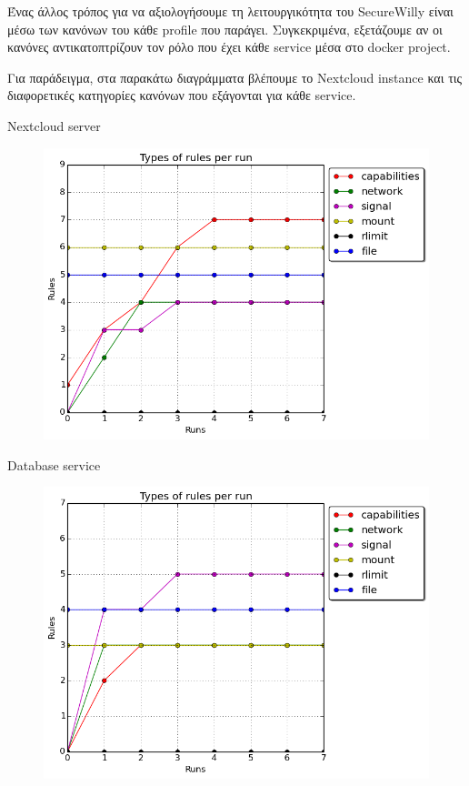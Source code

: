 Ένας άλλος τρόπος για να αξιολογήσουμε τη λειτουργικότητα του \en SecureWilly\gr{} είναι μέσω των κανόνων του κάθε \en profile\gr{} που παράγει. Συγκεκριμένα, εξετάζουμε αν οι κανόνες αντικατοπτρίζουν τον ρόλο που έχει κάθε \en service\gr{} μέσα στο \en docker project\gr{}.

Για παράδειγμα, στα παρακάτω διαγράμματα βλέπουμε το \en Nextcloud instance\gr{} και τις διαφορετικές κατηγορίες κανόνων που εξάγονται για κάθε \en service\gr{}.

\begin{center}{\en Nextcloud server\gr{}}\end{center}
\begin{figure}[h!]
  \centering
   \includegraphics[width=0.68\linewidth]{figures/nextcloud/types_nextcloud.png}
\end{figure}

\begin{center}{\en Database service\gr{}}\end{center}
\begin{figure}[H]
  \centering
   \includegraphics[width=0.68\linewidth]{figures/nextcloud/types_db.png}
\end{figure}

